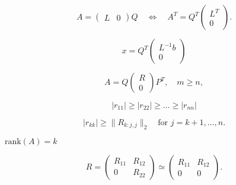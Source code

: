 {\newpage\clearpage
{}%
\begin{displaymath}
A = \left( \begin{array}{cc} L & 0 \end{array}\right) Q
\quad \Longleftrightarrow
\quad
A^T = Q^T \left( \begin{array}{c} L^T \\0\end{array}\right) .
\end{displaymath}%
\lthtmldisplayZ
\lthtmlcheckvsize\clearpage}

{\newpage\clearpage
{}%
\begin{displaymath}
x = Q^T \left( \begin{array}{c} L^{-1} b \\0 \end{array} \right)
\end{displaymath}%
\lthtmldisplayZ
\lthtmlcheckvsize\clearpage}

{\newpage\clearpage
{}%
\begin{displaymath}
A = Q\left( \begin{array}{c}R\\0\end{array}\right)P^T, \quad m \ge n,
\end{displaymath}%
\lthtmldisplayZ
\lthtmlcheckvsize\clearpage}

{\newpage\clearpage
{}%
\begin{displaymath}
|r_{11}| \ge |r_{22}| \ge \ldots \ge |r_{nn}|
\end{displaymath}%
\lthtmldisplayZ
\lthtmlcheckvsize\clearpage}

{\newpage\clearpage
{}%
\begin{displaymath}
|r_{kk}| \ge \|R_{k:j,j}\|_2 \quad \mbox{for $j = k+1, \ldots, n$.}
\end{displaymath}%
\lthtmldisplayZ
\lthtmlcheckvsize\clearpage}

{\newpage\clearpage
{}%
$\mbox{rank}(A) = k$%
\lthtmlinlinemathZ
\lthtmlcheckvsize\clearpage}

{\newpage\clearpage
{}%
\begin{displaymath}
R = \left( \begin{array}{cc}R_{11} & R_{12} \\0 & R_{22} \end{array}\right)
\simeq \left( \begin{array}{cc}R_{11} & R_{12} \\0 & 0\end{array}\right) .
\end{displaymath}%
\lthtmldisplayZ
\lthtmlcheckvsize\clearpage}

